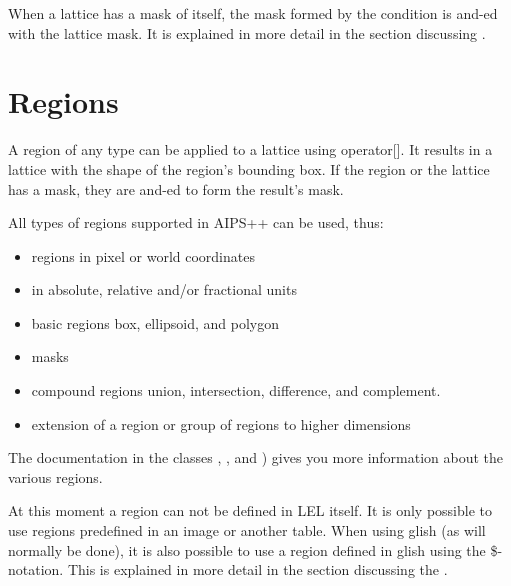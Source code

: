 When a lattice has a mask of itself, the mask formed by the condition
is and-ed with the lattice mask. It is explained in more detail in the
section discussing .

\section{\label{LEL:REGIONS}Regions}
A region of any type can be applied to a lattice using operator[].
It results in a lattice with the shape of the region's bounding box.
If the region or the lattice has a mask, they are and-ed to form
the result's mask.

All types of regions supported in AIPS++ can be used, thus:
\begin{itemize}
\item regions in pixel or world coordinates
\item in absolute, relative and/or fractional units
\item basic regions box, ellipsoid, and polygon
\item masks
\item compound regions union, intersection, difference, and complement.
\item extension of a region or group of regions to higher dimensions
\end{itemize}
The documentation in the classes
 ,
 , and
 )
gives you more information about the various regions.

At this moment a region can not be defined in LEL itself. It is
only possible to use regions predefined in an image or another table.
When using glish (as will normally be done), it is also possible
to use a region defined in glish using the \$-notation. This is
explained in more detail in the section discussing the
.

